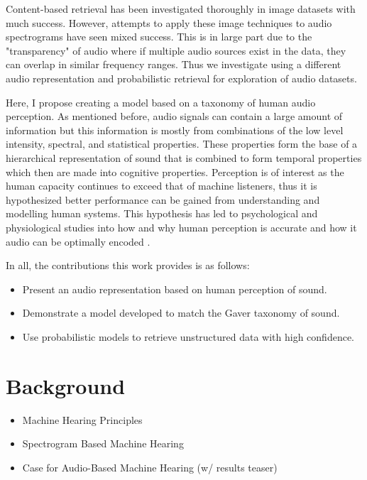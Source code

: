 Content-based retrieval has been investigated thoroughly in image datasets with much success. However, attempts to apply these image techniques to audio spectrograms have seen mixed success. This is in large part due to the "transparency" of audio where if multiple audio sources exist in the data, they can overlap in similar frequency ranges. Thus we investigate using a different audio representation and probabilistic retrieval for exploration of audio datasets.

Here, I propose creating a model based on a taxonomy of human audio perception. As mentioned before, audio signals can contain a large amount of information but this information is mostly from combinations of the low level intensity, spectral, and statistical properties. These properties form the base of a hierarchical representation of sound that is combined to form temporal properties which then are made into cognitive properties. Perception is of interest as the human capacity continues to exceed that of machine listeners, thus it is hypothesized better performance can be gained from understanding and modelling human systems. This hypothesis has led to psychological and physiological studies into how and why human perception is accurate and how it audio can be optimally encoded \cite{Gaver1993, Eggermont2001, slaney1993importance, Piazza2013}.


In all, the contributions this work provides is as follows:
\begin{itemize}
    \item Present an audio representation based on human perception of sound.
    \item Demonstrate a model developed to match the Gaver taxonomy of sound.
    \item Use probabilistic models to retrieve unstructured data with high confidence.
\end{itemize}

\section{Background}
\begin{itemize}
    \item Machine Hearing Principles
    \item Spectrogram Based Machine Hearing
    \item Case for Audio-Based Machine Hearing (w/ results teaser)
\end{itemize}

